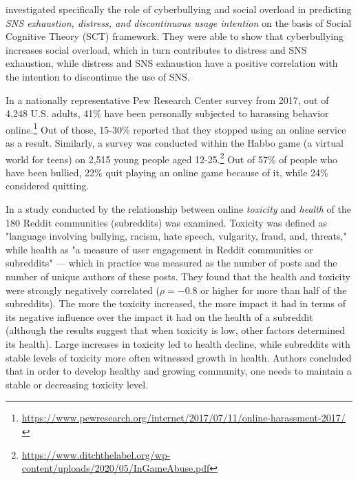 \documentclass[a4paper,fleqn]{cas-dc}
\begin{document}
\citet{cao2019consequences} investigated specifically the role of cyberbullying and social overload in predicting \textit{SNS exhaustion, distress, and discontinuous usage intention} on the basis of Social Cognitive Theory (SCT) framework. They were able to show that cyberbullying increases social overload, which in turn contributes to distress and SNS exhaustion, while distress and SNS exhaustion have a positive correlation with the intention to discontinue the use  of SNS.

In a nationally representative Pew Research Center survey from 2017, out of 4,248 U.S. adults, 41\% have been personally subjected to harassing behavior online.\footnote{\url{https://www.pewresearch.org/internet/2017/07/11/online-harassment-2017/}} Out of those, 15-30\% reported that they stopped using an online service as a result. Similarly, a survey was conducted within the Habbo game (a virtual world for teens) on 2,515 young people aged 12-25.\footnote{\url{https://www.ditchthelabel.org/wp-content/uploads/2020/05/InGameAbuse.pdf}} Out of 57\% of people who have been bullied, 22\% quit playing an online game because of it, while 24\% considered quitting.


In a study conducted by \citet{mohan2017impact} the relationship between online \emph{toxicity} and \emph{health} of the 180 Reddit communities (subreddits) was examined. Toxicity was defined as "language involving bullying, racism, hate speech, vulgarity, fraud, and, threats," while health as   "a measure of user engagement in Reddit communities or subreddits" --- which in practice was measured as the number of posts and the number of unique authors of these posts.
They found that the health and toxicity were strongly negatively correlated ($\rho=-0.8$ or higher for more than half of the subreddits). The more the toxicity increased, the more impact it had in terms of its negative influence over 
the impact it had on the health of a subreddit (although the results suggest that when toxicity is low, other factors determined its health).
Large increases in toxicity led to health decline, while subreddits with stable levels of toxicity more often witnessed growth in health. Authors concluded that in order to develop healthy and growing community, one needs to maintain a stable or decreasing toxicity level. 
\end{document}
